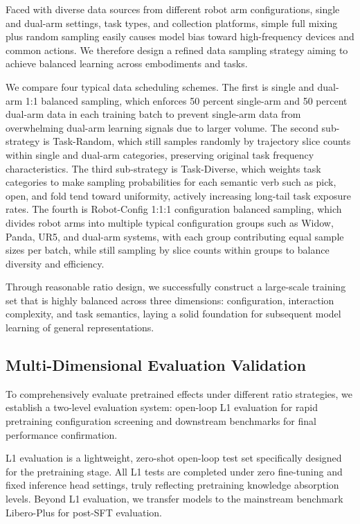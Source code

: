 \documentclass[11pt,a4paper]{article}
\begin{document}
Faced with diverse data sources from different robot arm configurations, single and dual-arm settings, task types, and collection platforms, simple full mixing plus random sampling easily causes model bias toward high-frequency devices and common actions. We therefore design a refined data sampling strategy aiming to achieve balanced learning across embodiments and tasks.

We compare four typical data scheduling schemes. The first is single and dual-arm 1:1 balanced sampling, which enforces 50 percent single-arm and 50 percent dual-arm data in each training batch to prevent single-arm data from overwhelming dual-arm learning signals due to larger volume. The second sub-strategy is Task-Random, which still samples randomly by trajectory slice counts within single and dual-arm categories, preserving original task frequency characteristics. The third sub-strategy is Task-Diverse, which weights task categories to make sampling probabilities for each semantic verb such as pick, open, and fold tend toward uniformity, actively increasing long-tail task exposure rates. The fourth is Robot-Config 1:1:1 configuration balanced sampling, which divides robot arms into multiple typical configuration groups such as Widow, Panda, UR5, and dual-arm systems, with each group contributing equal sample sizes per batch, while still sampling by slice counts within groups to balance diversity and efficiency.

Through reasonable ratio design, we successfully construct a large-scale training set that is highly balanced across three dimensions: configuration, interaction complexity, and task semantics, laying a solid foundation for subsequent model learning of general representations.

\subsection{Multi-Dimensional Evaluation Validation}

To comprehensively evaluate pretrained effects under different ratio strategies, we establish a two-level evaluation system: open-loop L1 evaluation for rapid pretraining configuration screening and downstream benchmarks for final performance confirmation.

L1 evaluation is a lightweight, zero-shot open-loop test set specifically designed for the pretraining stage. All L1 tests are completed under zero fine-tuning and fixed inference head settings, truly reflecting pretraining knowledge absorption levels. Beyond L1 evaluation, we transfer models to the mainstream benchmark Libero-Plus for post-SFT evaluation.
\end{document}
